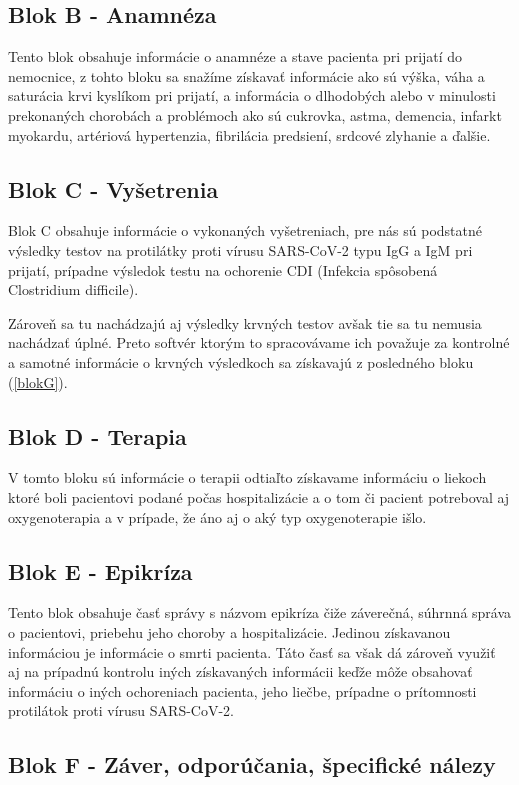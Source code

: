 \subsection{Blok B - Anamnéza}
\label{blokB}
Tento blok obsahuje informácie o anamnéze a stave pacienta pri prijatí do nemocnice, z tohto bloku sa snažíme získavať informácie ako sú výška, váha a saturácia krvi kyslíkom pri prijatí, a informácia o dlhodobých alebo v minulosti prekonaných chorobách a problémoch ako sú cukrovka, astma, demencia, infarkt myokardu, artériová hypertenzia, fibrilácia predsiení, srdcové zlyhanie a ďalšie.

\subsection{Blok C - Vyšetrenia}
\label{blokC}
Blok C obsahuje informácie o vykonaných vyšetreniach, pre nás sú podstatné výsledky testov na protilátky proti vírusu SARS-CoV-2 typu IgG a IgM pri prijatí, prípadne výsledok testu na ochorenie CDI (Infekcia spôsobená Clostridium difficile).

Zároveň sa tu nachádzajú aj výsledky krvných testov avšak tie sa tu nemusia nachádzať úplné. Preto softvér ktorým to spracovávame ich považuje za kontrolné a samotné informácie o krvných výsledkoch sa získavajú z posledného bloku (\ref{blokG}).

\subsection{Blok D - Terapia}
\label{blokD}
V tomto bloku sú informácie o terapii odtiaľto získavame informáciu o liekoch ktoré boli pacientovi podané počas hospitalizácie a o tom či pacient potreboval aj oxygenoterapia a v prípade, že áno aj o aký typ oxygenoterapie išlo.

\subsection{Blok E - Epikríza}
\label{blokE}
Tento blok obsahuje časť správy s názvom epikríza čiže záverečná, súhrnná správa o pacientovi, priebehu jeho choroby a hospitalizácie. Jedinou získavanou informáciou je informácie o smrti pacienta. Táto časť sa však dá zároveň využiť aj na prípadnú kontrolu iných získavaných informácii keďže môže obsahovať informáciu o iných ochoreniach pacienta, jeho liečbe, prípadne o prítomnosti protilátok proti vírusu SARS-CoV-2.

\subsection{Blok F - Záver, odporúčania, špecifické nálezy}

